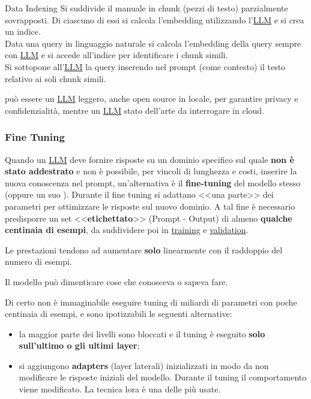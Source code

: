 \begin{definition}{Data Indexing}{}
    Si suddivide il manuale in chunk (pezzi di testo) parzialmente sovrapposti.
    Di ciascuno di essi si calcola l'embedding utilizzando l'\hyperref[sub:large_language_models]{LLM}  e si crea un indice.
    \\
    Data una query in linguaggio naturale si calcola l'embedding della query sempre con \hyperref[sub:large_language_models]{LLM}  e si accede all'indice per identificare i chunk simili.
    \\
    Si sottopone all'\hyperref[sub:large_language_models]{LLM}  la query inserendo nel prompt (come contesto) il testo relativo ai soli chunk simili.
    \begin{note}
         può essere un \hyperref[sub:large_language_models]{LLM} leggero, anche open source in locale, per garantire privacy e confidenzialità, mentre  un \hyperref[sub:large_language_models]{LLM} stato dell'arte da interrogare in cloud.
    \end{note}
\end{definition}
%
\subsubsection{Fine Tuning}\label{sub:eit_fine_tuning} %
Quando un \hyperref[sub:large_language_models]{LLM} deve fornire risposte su un dominio specifico sul quale \textbf{non è stato addestrato} e non è possibile, per vincoli di lunghezza e costi, inserire la nuova conoscenza nel prompt, un'alternativa è il \textbf{fine-tuning} del modello stesso (oppure un suo ).
\emptyln{}
Durante il fine tuning si adattano <<una parte>> dei parametri per ottimizzare le risposte sul nuovo dominio.
A tal fine è necessario predisporre un set <<\textbf{etichettato}>> (Prompt - Output) di almeno \textbf{qualche centinaia di esempi}, da suddividere poi in \hyperref[def:ts]{training} e \hyperref[def:val-set]{validation}.
\begin{note}
    Le prestazioni tendono ad aumentare \textbf{solo} linearmente con il raddoppio del numero di esempi.
\end{note}
\begin{warning}
    Il modello può dimenticare cose che conosceva o sapeva fare.
\end{warning}
Di certo non è immaginabile eseguire tuning di miliardi di parametri con poche centinaia di esempi, e sono ipotizzabili le seguenti alternative:
\begin{itemize}
    \item la maggior parte dei livelli sono bloccati e il tuning è eseguito \textbf{solo sull'ultimo o gli ultimi layer};
    \item si aggiungono \textbf{adapters} (layer laterali) inizializzati in modo da non modificare le risposte iniziali del modello.
        Durante il tuning il comportamento viene  modificato.
        La tecnica \ac{lora} è una delle più usate.
\end{itemize}
%

